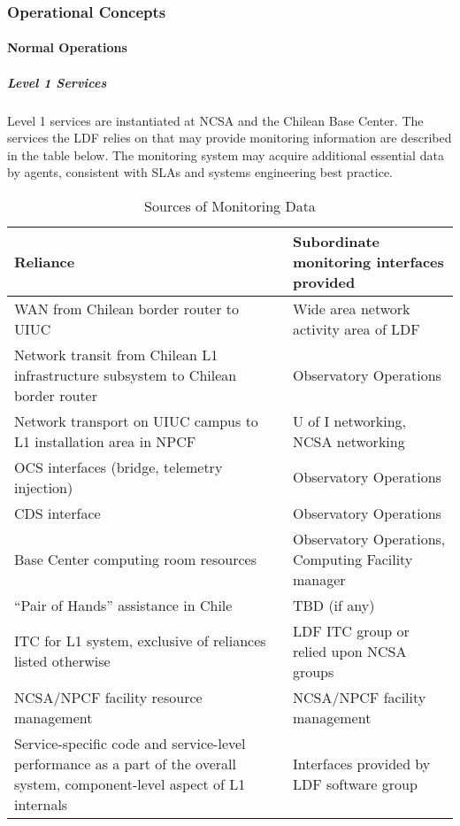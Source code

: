 \subsubsection{Operational Concepts}

\paragraph{Normal Operations}

\subparagraph{Level 1 Services} 

Level 1 services are instantiated at NCSA and the Chilean Base Center. The 
services the LDF relies on that may provide monitoring information are described 
in the table below. The monitoring system may acquire additional essential data 
by agents, consistent with SLAs and systems engineering best practice.

\begin{longtable}{|p{}|p{}|}
\caption{Sources of Monitoring Data} \\\hline
\textbf{Reliance} & \textbf{Subordinate monitoring interfaces provided} \\\hline
WAN from Chilean border router to UIUC & Wide area network activity area of LDF \\\hline
Network transit from Chilean L1 infrastructure subsystem to Chilean border router & Observatory Operations \\\hline
Network transport on UIUC campus to L1 installation area in NPCF & U of I networking, NCSA networking \\\hline
OCS interfaces (bridge, telemetry injection) & Observatory Operations \\\hline
CDS interface & Observatory Operations \\\hline
Base Center computing room resources & Observatory Operations, Computing Facility manager \\\hline
``Pair of Hands'' assistance in Chile & TBD (if any) \\\hline
ITC for L1 system, exclusive of reliances listed otherwise & LDF ITC group or relied upon NCSA groups \\\hline
NCSA/NPCF facility resource management & NCSA/NPCF facility management \\\hline
Service-specific code and service-level performance as a part of the overall system, component-level aspect of L1 internals & Interfaces provided by LDF software group \\\hline
\end{longtable}

